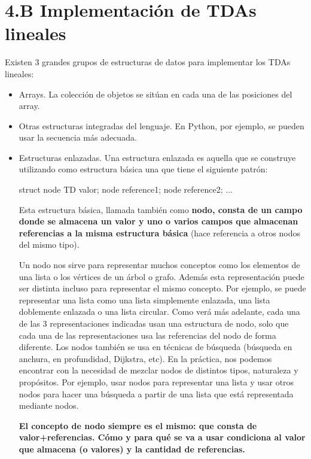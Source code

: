 
\section*{4.B Implementación de TDAs lineales}

Existen 3 grandes grupos de estructuras de datos para implementar los TDAs lineales:

\begin{itemize}
\item Arrays. La colección de objetos se sitúan en cada una de las posiciones del array.
\item Otras estructuras integradas del lenguaje. En Python, por ejemplo, se pueden usar la secuencia más adecuada.
\item Estructuras enlazadas. Una estructura enlazada es aquella que se construye utilizando como estructura básica una que tiene el siguiente patrón:

\hfil
\begin{minipage}{.25\textwidth}
\begin{pyverbatim}[][frame=single]
struct node {
   TD valor;
   node reference1;
   node reference2;
   ...
}
\end{pyverbatim}
\end{minipage}


Esta estructura básica, llamada también como \textbf{nodo, consta de un campo donde se almacena un valor y uno o varios campos que almacenan referencias a la misma estructura básica} (hace referencia a otros nodos del mismo tipo). 


\begin{note} \label{def:coneptoNodo}
Un nodo nos sirve para representar muchos conceptos como los elementos de una lista o los vértices de un árbol o grafo.  Además esta representación puede ser distinta incluso para representar el mismo concepto. Por ejemplo, se puede representar una lista como una lista simplemente enlazada, una lista doblemente enlazada o una lista circular. Como verá más adelante, cada una de las 3 representaciones indicadas usan una estructura de nodo, solo que cada una de las representaciones usa las referencias del nodo de forma diferente. Los nodos también se usa en técnicas de búsqueda (búsqueda en anchura, en profundidad, Dijkstra, etc). En la práctica, nos podemos encontrar con la necesidad de mezclar nodos de distintos tipos, naturaleza y propósitos. Por ejemplo, usar nodos para representar una lista y usar otros nodos para hacer una búsqueda a partir de una lista que está representada mediante nodos.

\textbf{
El concepto de nodo siempre es el mismo:  que consta de valor+referencias. Cómo y para qué se va a usar condiciona al valor que almacena (o valores) y la cantidad de referencias.}
\end{note}


\end{itemize}

